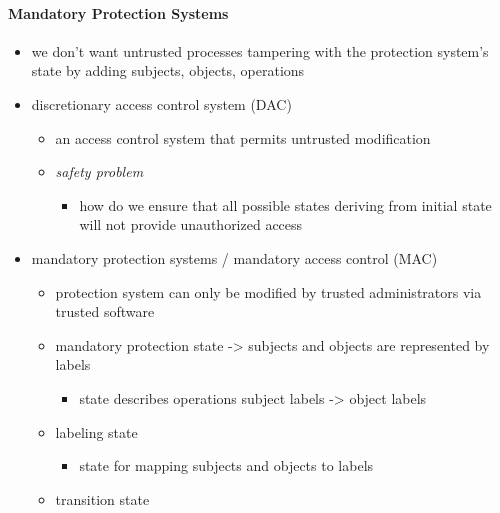 \documentclass[
  12pt]{findlay}
\providecommand{\tightlist}{%
  \setlength{\itemsep}{0pt}\setlength{\parskip}{0pt}}
\begin{document}
\hypertarget{mandatory-protection-systems}{%
\paragraph{Mandatory Protection
Systems}\label{mandatory-protection-systems}}

\begin{itemize}
\tightlist
\item
  we don't want untrusted processes tampering with the protection
  system's state by adding subjects, objects, operations
\item
  discretionary access control system (DAC)

  \begin{itemize}
  \tightlist
  \item
    an access control system that permits untrusted modification
  \item
    \emph{safety problem}

    \begin{itemize}
    \tightlist
    \item
      how do we ensure that all possible states deriving from initial
      state will not provide unauthorized access
    \end{itemize}
  \end{itemize}
\item
  mandatory protection systems / mandatory access control (MAC)

  \begin{itemize}
  \tightlist
  \item
    protection system can only be modified by trusted administrators via
    trusted software
  \item
    mandatory protection state -\textgreater{} subjects and objects are
    represented by labels

    \begin{itemize}
    \tightlist
    \item
      state describes operations subject labels -\textgreater{} object
      labels
    \end{itemize}
  \item
    labeling state

    \begin{itemize}
    \tightlist
    \item
      state for mapping subjects and objects to labels
    \end{itemize}
  \item
    transition state


\end{itemize}
\end{itemize}
\end{document}
